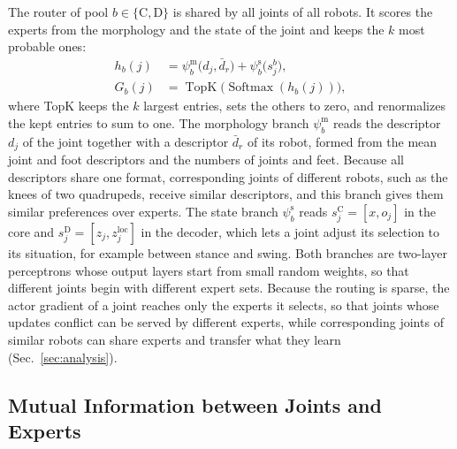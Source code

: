 The router of pool $b\in\{\mathrm{C},\mathrm{D}\}$ is shared by all joints of all robots. It scores the experts from
the morphology and the state of the joint and keeps the $k$ most probable ones:
\begin{equation}
\begin{aligned}
h_b(j)&=\psi^{\mathrm{m}}_b\bigl(d_j,\bar d_r\bigr)+\psi^{\mathrm{s}}_b\bigl(s^b_j\bigr),\\
G_b(j)&=\operatorname{TopK}\bigl(\operatorname{Softmax}(h_b(j))\bigr),
\end{aligned}
\label{eq:router}
\end{equation}
where TopK keeps the $k$ largest entries, sets the others to zero, and renormalizes the kept entries to sum to one.
The morphology branch $\psi^{\mathrm{m}}_b$ reads the descriptor $d_j$ of the joint together with a descriptor
$\bar d_r$ of its robot, formed from the mean joint and foot descriptors and the numbers of joints and feet. Because
all descriptors share one format, corresponding joints of different robots, such as the knees of two quadrupeds,
receive similar descriptors, and this branch gives them similar preferences over experts. The state branch
$\psi^{\mathrm{s}}_b$ reads $s^{\mathrm{C}}_j=[x,o_j]$ in the core and $s^{\mathrm{D}}_j=[z_j,z^{\mathrm{loc}}_j]$ in
the decoder, which lets a joint adjust its selection to its situation, for example between stance and swing. Both
branches are two-layer perceptrons whose output layers start from small random weights, so that different joints
begin with different expert sets. Because the routing is sparse, the actor gradient of a joint reaches only the experts
it selects, so that joints whose updates conflict can be served by different experts, while corresponding joints of
similar robots can share experts and transfer what they learn (Sec.~\ref{sec:analysis}).

\subsection{Mutual Information between Joints and Experts}
\label{sec:mi}

